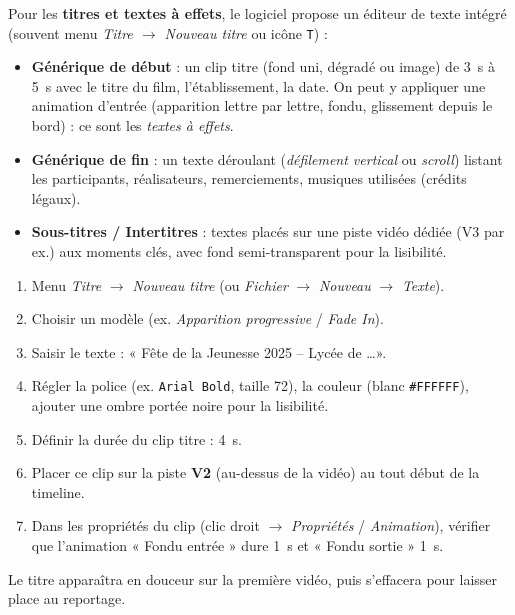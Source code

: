 \documentclass[11pt]{article}
\begin{document}
Pour les \textbf{titres et textes à effets}, le logiciel propose un éditeur de texte intégré (souvent menu \emph{Titre $\rightarrow$ Nouveau titre} ou icône \texttt{T}) :

\begin{itemize}
  \item \textbf{Générique de début} : un clip titre (fond uni, dégradé ou image) de \SI{3}{s} à \SI{5}{s} avec le titre du film, l'établissement, la date. On peut y appliquer une animation d'entrée (apparition lettre par lettre, fondu, glissement depuis le bord) : ce sont les \emph{textes à effets}.
  \item \textbf{Générique de fin} : un texte déroulant (\emph{défilement vertical} ou \emph{scroll}) listant les participants, réalisateurs, remerciements, musiques utilisées (crédits légaux).
  \item \textbf{Sous-titres / Intertitres} : textes placés sur une piste vidéo dédiée (V3 par ex.) aux moments clés, avec fond semi-transparent pour la lisibilité.
\end{itemize}

\begin{exemplebox}
\begin{enumerate}
  \item Menu \emph{Titre} $\rightarrow$ \emph{Nouveau titre} (ou \emph{Fichier} $\rightarrow$ \emph{Nouveau} $\rightarrow$ \emph{Texte}).
  \item Choisir un modèle (ex. \emph{Apparition progressive} / \emph{Fade In}).
  \item Saisir le texte : « Fête de la Jeunesse 2025 -- Lycée de \dots ».
  \item Régler la police (ex. \texttt{Arial Bold}, taille 72), la couleur (blanc \texttt{\#FFFFFF}), ajouter une ombre portée noire pour la lisibilité.
  \item Définir la durée du clip titre : \SI{4}{s}.
  \item Placer ce clip sur la piste \textbf{V2} (au-dessus de la vidéo) au tout début de la timeline.
  \item Dans les propriétés du clip (clic droit $\rightarrow$ \emph{Propriétés} / \emph{Animation}), vérifier que l'animation « Fondu entrée » dure \SI{1}{s} et « Fondu sortie » \SI{1}{s}.
\end{enumerate}
Le titre apparaîtra en douceur sur la première vidéo, puis s'effacera pour laisser place au reportage.
\end{exemplebox}
\end{document}
